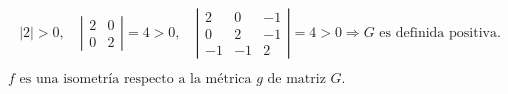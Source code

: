 \documentclass[12pt]{article}
\begin{document}
\begin{ejercicio}[4 puntos]
\begin{enumerate}
			\[
			|2| > 0, \quad \left|\begin{matrix}2 & 0 \\ 0 & 2\end{matrix}\right| = 4 > 0,
			\quad \left|\begin{matrix}2 & 0 & -1 \\ 0 & 2 & -1 \\ -1 & -1 & 2\end{matrix}\right| = 4 > 0
			\Rightarrow G \text{ es definida positiva.}
			\]
			
			 \( f \text{ es una isometría respecto a la métrica } g \text{ de matriz } G.\)
			
		\end{enumerate}
	\end{ejercicio}
	
\end{document}

